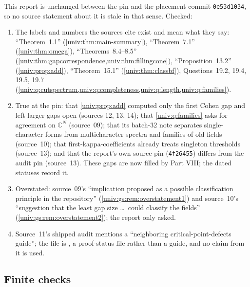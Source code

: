 \documentclass[11pt,letterpaper]{article}
\numberwithin{equation}{section}
\theoremstyle{definition}
\theoremstyle{remark}
\newcommand{\C}{\mathbb C}
\newcommand{\shorthash}{\texttt{4f26455}}
\begin{document}
This report is unchanged between the pin and the placement commit \texttt{0e53d1034}, so no source
statement about it is stale in that sense. Checked:
\begin{enumerate}
\item The labels and numbers the sources cite exist and mean what they say: ``Theorem~1.1''
(\cref{univ:thm:main-summary}), ``Theorem~7.1'' (\cref{univ:thm:omega}), ``Theorems~8.4--8.5''
(\cref{univ:thm:gapcorrespondence,univ:thm:fillingcone}), ``Proposition~13.2''
(\cref{univ:prop:add}), ``Theorem~15.1'' (\cref{univ:thm:classbf}), Questions~19.2, 19.4, 19.5, 19.7
(\cref{univ:q:cutspectrum,univ:q:completeness,univ:q:length,univ:q:families}).
\item True at the pin: that \cref{univ:prop:add} computed only the first Cohen gap and left larger
gaps open (sources 12, 13, 14); that \cref{univ:q:families} asks for agreement on $\C^N$ (source~09);
that its batch-32 note separates single-character forms from multicharacter spectra and families of
old fields (source~10); that first-kappa-coefficients already treats singleton thresholds
(source~13); and that the report's own source pin (\shorthash) differs from the audit pin
(source~13). These gaps are now filled by Part VIII; the dated statuses record it.
\item Overstated: source~09's ``implication proposed as a possible classification principle in the
repository'' (\cref{univ:gs:rem:overstatement1}) and source~10's ``suggestion that the least gap size
\ldots\ could classify the fields'' (\cref{univ:gs:rem:overstatement2}); the report only asked.
\item Source~11's shipped audit mentions a ``neighboring critical-point-defects guide''; the file is
,
a proof-status file rather than a guide, and no claim from it is used.
\end{enumerate}

\subsection{Finite checks}
\end{document}
